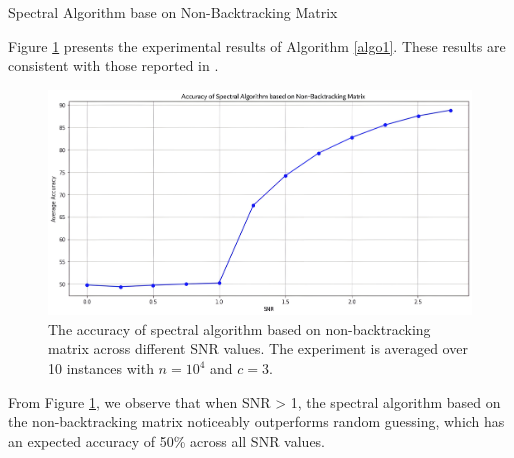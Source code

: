 \begin{algorithm}[H]\label{algo1}
\SetAlgoLined       %
\LinesNumbered
{}
\BlankLine
\caption{Spectral Algorithm base on Non-Backtracking Matrix}
\end{algorithm}
\vspace{6mm}
Figure \ref{fig:spec_algo} presents the experimental results of Algorithm \ref{algo1}. These results are consistent with those reported in \cite{the_non-backtracking}.
\begin{figure}[H]
    \centering
    \includegraphics[width=1\linewidth]{Figures/spec_algo.jpg}
    \caption[Accuracy of the spectral algorithm based on non-backtracking matrix]{The accuracy of spectral algorithm based on non-backtracking matrix across different SNR values. The experiment is averaged over 10 instances with $n=10^4$ and $c=3.$}
    \label{fig:spec_algo}
\end{figure}
From Figure \ref{fig:spec_algo}, we observe that when SNR > 1, the spectral algorithm based on the non-backtracking matrix noticeably outperforms random guessing, which has an expected accuracy of 50\% across all SNR values.
